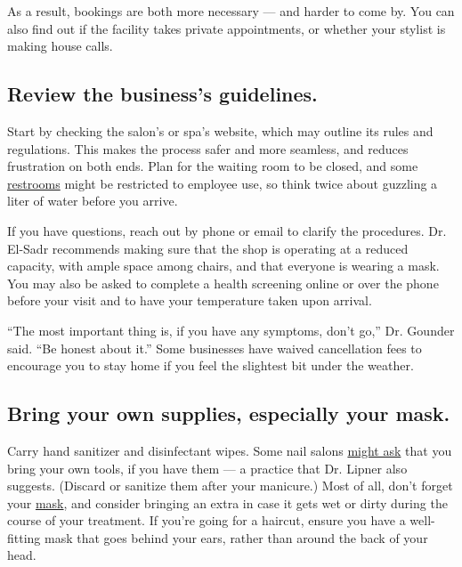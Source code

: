 As a result, bookings are both more necessary --- and harder to come by.
You can also find out if the facility takes private appointments, or
whether your stylist is making house calls.

\hypertarget{review-the-businesss-guidelines}{%
\subsection{Review the business's
guidelines.}\label{review-the-businesss-guidelines}}

Start by checking the salon's or spa's website, which may outline its
rules and regulations. This makes the process safer and more seamless,
and reduces frustration on both ends. Plan for the waiting room to be
closed, and some
\href{https://www.nytimes3xbfgragh.onion/2020/06/24/style/coronavirus-public-bathrooms.html}{restrooms}
might be restricted to employee use, so think twice about guzzling a
liter of water before you arrive.

If you have questions, reach out by phone or email to clarify the
procedures. Dr. El-Sadr recommends making sure that the shop is
operating at a reduced capacity, with ample space among chairs, and that
everyone is wearing a mask. You may also be asked to complete a health
screening online or over the phone before your visit and to have your
temperature taken upon arrival.

``The most important thing is, if you have any symptoms, don't go,'' Dr.
Gounder said. ``Be honest about it.'' Some businesses have waived
cancellation fees to encourage you to stay home if you feel the
slightest bit under the weather.

\hypertarget{bring-your-own-supplies-especially-your-mask}{%
\subsection{Bring your own supplies, especially your
mask.}\label{bring-your-own-supplies-especially-your-mask}}

Carry hand sanitizer and disinfectant wipes. Some nail salons
\href{https://www.glamour.com/story/nail-salon-coronavirus-safety}{might
ask} that you bring your own tools, if you have them --- a practice that
Dr. Lipner also suggests. (Discard or sanitize them after your
manicure.) Most of all, don't forget your
\href{https://www.nytimes3xbfgragh.onion/2020/05/22/at-home/best-face-masks-fashion-coronavirus.html}{mask},
and consider bringing an extra in case it gets wet or dirty during the
course of your treatment. If you're going for a haircut, ensure you have
a well-fitting mask that goes behind your ears, rather than around the
back of your head.

